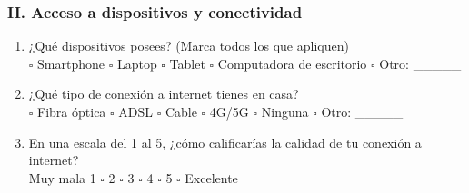 \documentclass[12pt, a4paper]{article}
\begin{document}
\subsubsection*{II. Acceso a dispositivos y conectividad}
\begin{enumerate}[resume, label=\arabic*.]
    \item ¿Qué dispositivos posees? (Marca todos los que apliquen)\\
    $\square$ Smartphone \hspace{1em} $\square$ Laptop \hspace{1em} $\square$ Tablet \hspace{1em} $\square$ Computadora de escritorio \hspace{1em} $\square$ Otro: \_\_\_\_\_
    \item ¿Qué tipo de conexión a internet tienes en casa?\\
    $\square$ Fibra óptica \hspace{1em} $\square$ ADSL \hspace{1em} $\square$ Cable \hspace{1em} $\square$ 4G/5G \hspace{1em} $\square$ Ninguna \hspace{1em} $\square$ Otro: \_\_\_\_\_
    \item En una escala del 1 al 5, ¿cómo calificarías la calidad de tu conexión a internet?\\
    Muy mala \hspace{1em} 1 $\square$ \hspace{1em} 2 $\square$ \hspace{1em} 3 $\square$ \hspace{1em} 4 $\square$ \hspace{1em} 5 $\square$ Excelente
\end{enumerate}
\end{document}
